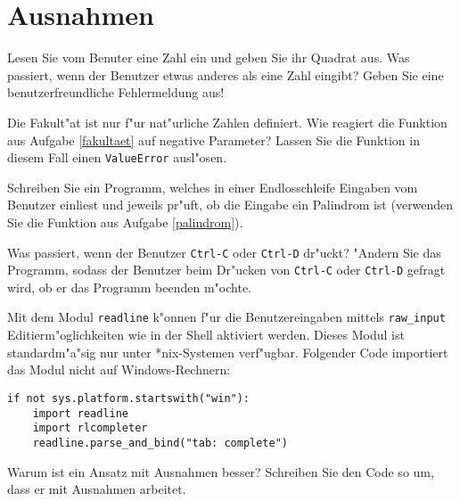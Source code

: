 \section*{Ausnahmen}
\begin{aufgabe}
Lesen Sie vom Benuter eine Zahl ein und geben Sie ihr Quadrat aus. Was passiert, wenn der Benutzer etwas anderes als eine Zahl eingibt? Geben Sie eine benutzerfreundliche Fehlermeldung aus!
\end{aufgabe}

\begin{aufgabe}
Die Fakult"at ist nur f"ur nat"urliche Zahlen definiert. Wie reagiert die Funktion aus Aufgabe \ref{fakultaet} auf negative Parameter? Lassen Sie die Funktion in diesem Fall einen \texttt{ValueError} ausl"osen.
\end{aufgabe}

\begin{aufgabe}Schreiben Sie ein Programm, welches in einer Endlosschleife Eingaben vom Benutzer einliest und jeweils pr"uft, ob die Eingabe ein Palindrom ist (verwenden Sie die Funktion aus Aufgabe \ref{palindrom}). 

Was passiert, wenn der Benutzer \texttt{Ctrl-C} oder \texttt{Ctrl-D} dr"uckt? "Andern Sie das Programm, sodass der Benutzer beim Dr"ucken von \texttt{Ctrl-C} oder \texttt{Ctrl-D} gefragt wird, ob er das Programm beenden m"ochte.
\end{aufgabe}

\begin{aufgabe}
Mit dem Modul \texttt{readline} k"onnen f"ur die Benutzereingaben mittels \texttt{raw\_input} Editierm"oglichkeiten wie in der Shell aktiviert werden. Dieses Modul ist standardm"a"sig nur unter *nix-Systemen verf"ugbar. Folgender Code importiert das Modul nicht auf Windows-Rechnern:
\begin{lstlisting}
if not sys.platform.startswith("win"):
    import readline
    import rlcompleter
    readline.parse_and_bind("tab: complete")
\end{lstlisting}
Warum ist ein Ansatz mit Ausnahmen besser? Schreiben Sie den Code so um, dass er mit Ausnahmen arbeitet.
\end{aufgabe}

